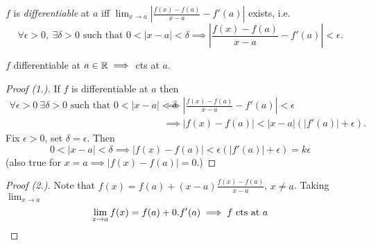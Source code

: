 \setcounter{lecture}{4}

\pagebreak

\label{sub:differentiation}

\vspace*{5pt}

\begin{definition}
$f$ is \emph{differentiable} at $a$ iff $\lim_{x\to a} \left|\frac{f(x)-f(a)}{x-a}-f'(a)\right|$ exists, i.e.
\[\forall \epsilon > 0,~\exists \delta > 0\text{ such that } 0<|x-a| < \delta \implies \left|\frac{f(x)-f(a)}{x-a}-f'(a)\right| < \epsilon.\]	
\end{definition}




\begin{theorem}	
$f$ differentiable at $a\in \mathbb{R} \implies $ cts at $a$.
\end{theorem}
\begin{proof}[Proof (1.)] If $f$ is differentiable at $a$ then
	\[\begin{aligned}\forall \epsilon >0~ \exists \delta  > 0 \text{ such that } 0 < |x-a| < \delta &\implies \left|\frac{f(x) - f(a)}{x-a} - f'(a)\right| < \epsilon \\ 
	&\implies |f(x) - f(a)| < |x-a|(|f'(a)| + \epsilon).	
\end{aligned}
\] 
	Fix $\epsilon > 0$, set $\delta = \epsilon$. Then \[0 < |x-a| < \delta \implies  |f(x) - f(a)| < \epsilon(|f'(a)| + \epsilon) = k\epsilon\] (also true for $x = a \implies |f(x) - f(a)| = 0$.)
\end{proof}
\begin{proof}[Proof (2.)]
Note that $f(x) = f(a) + (x-a)\frac{f(x) -f(a)}{x-a}$, $x \neq a$. Taking  $\lim_{x\to a}$  \[\lim_{x\to a}f(x) = f(a) + 0.f'(a) \implies f \text{ cts at } a\qedhere\]\end{proof}\vspace*{5pt}

\vspace*{5pt}


